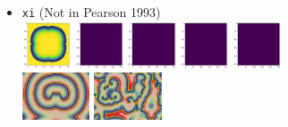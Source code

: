 \begin{itemize}
\item {\tt xi} (Not in Pearson 1993)\\
\includegraphics[height=1.4cm]{python_codes/fieldstone_171/pearson93_rand/xi_solution_0001000_u}
\includegraphics[height=1.4cm]{python_codes/fieldstone_171/pearson93_rand/xi_solution_0010000_u}
\includegraphics[height=1.4cm]{python_codes/fieldstone_171/pearson93_rand/xi_solution_0030000_u}
\includegraphics[height=1.4cm]{python_codes/fieldstone_171/pearson93_rand/xi_solution_0050000_u}
\includegraphics[height=1.4cm]{python_codes/fieldstone_171/pearson93_rand/xi_solution_final_u}\\
\includegraphics[height=1.4cm]{python_codes/fieldstone_171/images/munafo_xi1}
\includegraphics[height=1.4cm]{python_codes/fieldstone_171/images/munafo_xi2}


\end{itemize}
